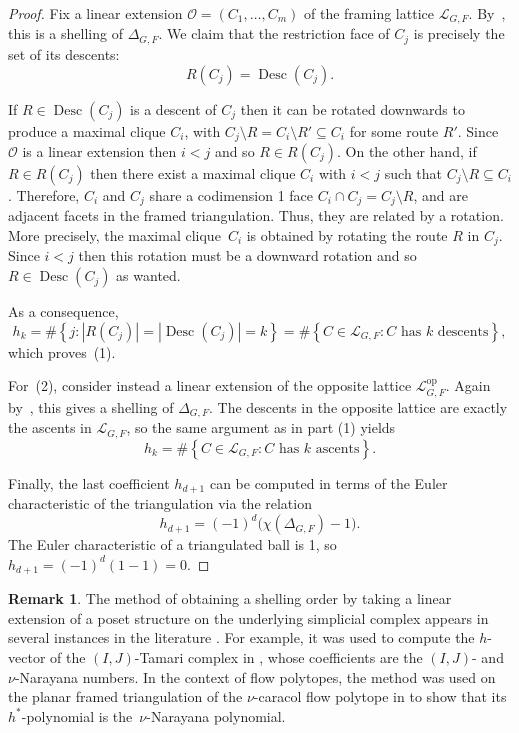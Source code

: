 \documentclass[12pt, reqno]{amsart}
\newcommand{\set}[1]{\left\lbrace#1\right\rbrace}
\newcommand{\Desc}{\operatorname{Desc}}
\theoremstyle{plain}
\theoremstyle{definition}
\newtheorem{remark}[theorem]{Remark}
\numberwithin{equation}{section}
\newcommand\scrL{\mathscr{L}}
\begin{document}
\begin{proof}
Fix a linear extension $\mathscr O=(C_1,\ldots,C_m)$ of the framing lattice $\scrL_{G,F}$. By~, this is a shelling of $\Delta_{G,F}$. We claim that the restriction face of $C_j$ is precisely the set of its descents: %
\[
R(C_j)=\Desc(C_j).
\]

If $R\in \Desc(C_j)$ is a descent of $C_j$ then it can be rotated downwards to produce a maximal clique $C_i$, with $C_j\setminus R = C_i\setminus R'\subseteq C_i$ for some route $R'$. Since $\mathscr O$ is a linear extension then $i<j$ and so $R\in R(C_j)$. On the other hand, if $R \in R(C_j)$ then there exist a maximal clique $C_i$ with $i<j$ such that $C_j\setminus R \subseteq C_i$. Therefore, $C_i$ and $C_j$ share a codimension 1 face $C_i\cap C_j=C_j\setminus R$, and are adjacent facets in the framed triangulation. Thus, they are related by a rotation. More precisely, the maximal clique~$C_i$ is obtained by rotating the route $R$ in $C_j$. Since $i<j$ then this rotation must be a downward rotation and so $R\in \Desc(C_j)$ as wanted.

As a consequence,
\[
h_k=\#\set{j:|R(C_j)|= |\Desc(C_j)|=k}=\#\set{C\in\scrL_{G,F}: C\text{ has $k$ descents}},
\]
which proves~(1).


For~(2), consider instead a linear extension of the opposite lattice $\scrL_{G,F}^{\mathrm{op}}$. Again by~, this gives a shelling of $\Delta_{G,F}$. The descents in the opposite lattice are exactly the ascents in $\scrL_{G,F}$, so the same argument as in part (1) yields
\[
h_k=\#\set{C\in\scrL_{G,F}: C\text{ has $k$ ascents}}.
\]


Finally, the last coefficient $h_{d+1}$ can be computed in terms of the Euler characteristic of the triangulation via the relation
    \[
    h_{d+1} = (-1)^d \bigl(\chi(\Delta_{G,F}) - 1\bigr).
    \] 
    The Euler characteristic of a triangulated ball is 1, so $h_{d+1}=(-1)^d (1 - 1)=0$.
\end{proof}

\begin{remark}
The method of obtaining a shelling order by taking a linear extension of a poset structure on the underlying simplicial complex appears in several instances in the literature \cite{BGMY23, BBBHPSY24, BS24, CeballosPAdrolSarmiento2019}. For example, it was used to compute the $h$-vector of the $(I,J)$-Tamari complex in \cite{CeballosPAdrolSarmiento2019}, whose coefficients are the $(I,J)$- and $\nu$-Narayana numbers. In the context of flow polytopes, the method was used on the planar framed triangulation of the $\nu$-caracol flow polytope in \cite{BGMY23} to show that its $h^*$-polynomial is the~$\nu$-Narayana polynomial.
\end{remark}
\end{document}
